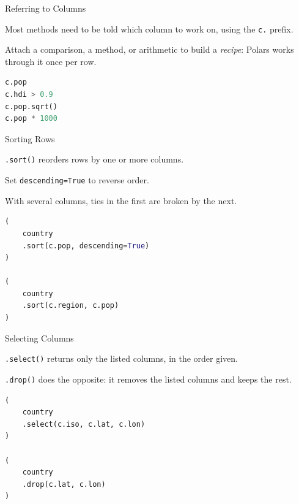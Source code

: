 \documentclass[8pt,aspectratio=169]{beamer}
\begin{document}
\begin{frame}[fragile]{Referring to Columns}
\begin{splitcode}{%

Most methods need to be told which column to work on, using the \texttt{c.} prefix.

Attach a comparison, a method, or arithmetic to build a \textit{recipe}: Polars works through it once per row.

}
\begin{lstlisting}[language=Python]
c.pop
c.hdi > 0.9
c.pop.sqrt()
c.pop * 1000
\end{lstlisting}
\end{splitcode}
\end{frame}

\begin{frame}[fragile]{Sorting Rows}
\begin{splitcode}{%

\texttt{.sort()} reorders rows by one or more columns.

Set \texttt{descending=True} to reverse order.

With several columns, ties in the first are broken by the next.

}
\begin{lstlisting}[language=Python]
(
    country
    .sort(c.pop, descending=True)
)

(
    country
    .sort(c.region, c.pop)
)
\end{lstlisting}
\end{splitcode}
\end{frame}

\begin{frame}[fragile]{Selecting Columns}
\begin{splitcode}{%

\texttt{.select()} returns only the listed columns, in the order given.

\texttt{.drop()} does the opposite: it removes the listed columns and keeps the rest.

}
\begin{lstlisting}[language=Python]
(
    country
    .select(c.iso, c.lat, c.lon)
)

(
    country
    .drop(c.lat, c.lon)
)
\end{lstlisting}
\end{splitcode}
\end{frame}
\end{document}
